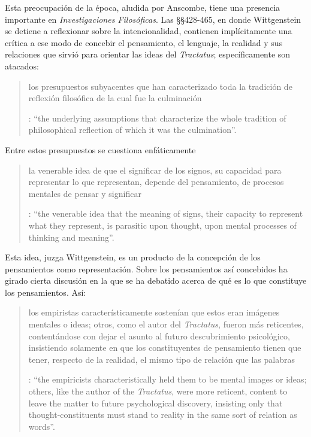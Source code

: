 Esta preocupación de la época, aludida por Anscombe, tiene una presencia importante en \emph{Investigaciones Filosóficas}. Las \S\S428-465, en donde Wittgenstein se detiene a reflexionar sobre la intencionalidad, contienen implícitamente una crítica a ese modo de concebir el pensamiento, el lenguaje, la realidad y sus relaciones que sirvió para orientar las ideas del \emph{Tractatus}; específicamente son atacados: \blockquote[{\Cite[3]{hacker2000mind}}: \enquote{the underlying assumptions that characterize the whole tradition of philosophical reflection of which it was the culmination}.]{los presupuestos subyacentes que han caracterizado toda la tradición de reflexión filosófica de la cual  fue la culminación}. Entre estos presupuestos se cuestiona enfáticamente \blockquote[{\Cite[3]{hacker2000mind}}: \enquote{the venerable idea that the meaning of signs, their capacity to represent what they represent, is parasitic upon thought, upon mental processes of thinking and meaning}.]{la venerable idea de que el significar de los signos, su capacidad para representar lo que representan, depende del pensamiento, de procesos mentales de pensar y significar}. Esta idea, juzga Wittgenstein, es un producto de la concepción de los pensamientos como representación. Sobre los pensamientos así concebidos ha girado cierta discusión en la que se ha debatido acerca de qué es lo que constituye los pensamientos. Así: \blockquote[{\Cite[3]{hacker2000mind}}: \enquote{the empiricists characteristically held them to be mental images or ideas; others, like the author of the \emph{Tractatus}, were more reticent, content to leave the matter to future psychological discovery, insisting only that thought-constituents must stand to reality in the same sort of relation as words}.]{los empiristas característicamente sostenían que estos eran imágenes mentales o ideas; otros, como el autor del \emph{Tractatus}, fueron más reticentes, contentándose con dejar el asunto al futuro descubrimiento psicológico, insistiendo solamente en que los constituyentes de pensamiento tienen que tener, respecto de la realidad, el mismo tipo de relación que las palabras}.

